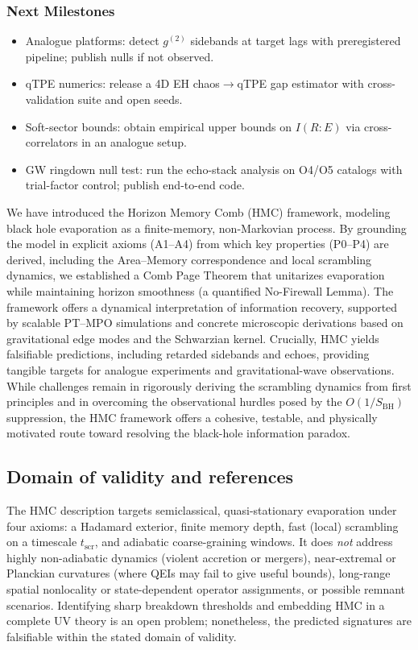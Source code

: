 \documentclass[11pt,a4paper]{article}
\newcommand{\HMC}{\textsc{HMC}\xspace}
\newcommand{\BH}{\mathrm{BH}}
\newcommand{\scr}{\mathrm{scr}}
\theoremstyle{plain}
\theoremstyle{definition}
\theoremstyle{remark}
\begin{document}
\subsubsection{Next Milestones}
\begin{itemize}[leftmargin=*]
\item Analogue platforms: detect $g^{(2)}$ sidebands at target lags with preregistered pipeline; publish nulls if not observed.
\item qTPE numerics: release a 4D EH chaos$\to$qTPE gap estimator with cross-validation suite and open seeds.
\item Soft-sector bounds: obtain empirical upper bounds on $I(R{:}E)$ via cross-correlators in an analogue setup.
\item GW ringdown null test: run the echo-stack analysis on O4/O5 catalogs with trial-factor control; publish end-to-end code.
\end{itemize}
We have introduced the Horizon Memory Comb (\HMC{}) framework, modeling black hole evaporation as a finite-memory, non-Markovian process. By grounding the model in explicit axioms (A1--A4) from which key properties (P0--P4) are derived, including the Area--Memory correspondence and local scrambling dynamics, we established a Comb Page Theorem that unitarizes evaporation while maintaining horizon smoothness (a quantified No-Firewall Lemma). The framework offers a dynamical interpretation of information recovery, supported by scalable PT--MPO simulations and concrete microscopic derivations based on gravitational edge modes and the Schwarzian kernel. Crucially, \HMC{} yields falsifiable predictions, including retarded sidebands and echoes, providing tangible targets for analogue experiments and gravitational-wave observations. While challenges remain in rigorously deriving the scrambling dynamics from first principles and in overcoming the observational hurdles posed by the $O(1/S_{\BH})$ suppression, the \HMC{} framework offers a cohesive, testable, and physically motivated route toward resolving the black-hole information paradox.

\subsection{Domain of validity and references}
The \HMC{} description targets semiclassical, quasi-stationary evaporation under four axioms: a Hadamard exterior, finite memory depth, fast (local) scrambling on a timescale $t_{\scr}$, and adiabatic coarse-graining windows. It does \emph{not} address highly non-adiabatic dynamics (violent accretion or mergers), near-extremal or Planckian curvatures (where QEIs may fail to give useful bounds), long-range spatial nonlocality or state-dependent operator assignments, or possible remnant scenarios. Identifying sharp breakdown thresholds and embedding \HMC{} in a complete UV theory is an open problem; nonetheless, the predicted signatures are falsifiable within the stated domain of validity.
\end{document}
